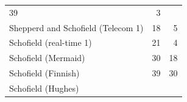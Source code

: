 \documentclass[]{book}
\begin{document}
\begin{longtable}[]{@{}lrr@{}}
\begin{minipage}[t]{0.18\columnwidth}
39\strut
\end{minipage} & \begin{minipage}[t]{0.18\columnwidth}\raggedleft\strut
3\strut
\end{minipage}\tabularnewline
\begin{minipage}[t]{0.44\columnwidth}\raggedright\strut
Shepperd and Schofield (Telecom 1)
\citeyearpar{Shepperd97_Analogy}\strut
\end{minipage} & \begin{minipage}[t]{0.18\columnwidth}\raggedleft\strut
18\strut
\end{minipage} & \begin{minipage}[t]{0.18\columnwidth}\raggedleft\strut
5\strut
\end{minipage}\tabularnewline
\begin{minipage}[t]{0.44\columnwidth}\raggedright\strut
Schofield (real-time 1)
\citeyearpar[\citet{Shepperd97_Analogy}]{Schofield98PhD}\strut
\end{minipage} & \begin{minipage}[t]{0.18\columnwidth}\raggedleft\strut
21\strut
\end{minipage} & \begin{minipage}[t]{0.18\columnwidth}\raggedleft\strut
4\strut
\end{minipage}\tabularnewline
\begin{minipage}[t]{0.44\columnwidth}\raggedright\strut
Schofield (Mermaid) \citeyearpar{Schofield98PhD}\strut
\end{minipage} & \begin{minipage}[t]{0.18\columnwidth}\raggedleft\strut
30\strut
\end{minipage} & \begin{minipage}[t]{0.18\columnwidth}\raggedleft\strut
18\strut
\end{minipage}\tabularnewline
\begin{minipage}[t]{0.44\columnwidth}\raggedright\strut
Schofield (Finnish) \citeyearpar{Schofield98PhD}\strut
\end{minipage} & \begin{minipage}[t]{0.18\columnwidth}\raggedleft\strut
39\strut
\end{minipage} & \begin{minipage}[t]{0.18\columnwidth}\raggedleft\strut
30\strut
\end{minipage}\tabularnewline
\begin{minipage}[t]{0.44\columnwidth}\raggedright\strut
Schofield (Hughes) \citeyearpar{Schofield98PhD}\strut

\end{minipage}
\end{longtable}
\end{document}
